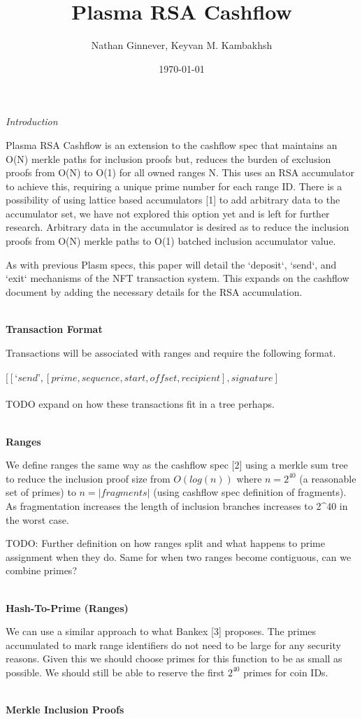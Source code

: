 \documentclass[12pt]{article}
\title{Plasma RSA Cashflow}
\author{Nathan Ginnever, Keyvan M. Kambakhsh}
\date{\today}
\begin{document}
\maketitle
\centerline{\textit{Introduction}}

Plasma RSA Cashflow is an extension to the cashflow spec that maintains an O(N) merkle paths for inclusion proofs but, reduces the burden of exclusion proofs from O(N) to O(1) for all owned ranges N. This uses an RSA accumulator to achieve this, requiring a unique prime number for each range ID. There is a possibility of using lattice based accumulators [1] to add arbitrary data to the accumulator set, we have not explored this option yet and is left for further research. Arbitrary data in the accumulator is desired as to reduce the inclusion proofs from O(N) merkle paths to O(1) batched inclusion accumulator value. 

As with previous Plasm specs, this paper will detail the `deposit`, `send`, and `exit` mechanisms of the NFT transaction system. This expands on the cashflow document by adding the necessary details for the RSA accumulation.
\\
\\
\centerline{\textbf{Transaction Format}}

Transactions will be associated with ranges and require the following format.
\\
\\
$[[‘send’, [prime, sequence, start, offset, recipient], signature]$
\\
\\
TODO expand on how these transactions fit in a tree perhaps.
\\
\\
\centerline{\textbf{Ranges}}

We define ranges the same way as the cashflow spec [2] using a merkle sum tree to reduce the inclusion proof size from $O(log(n))$ where $n = 2^{40}$ (a reasonable set of primes) to $n = |fragments|$ (using cashflow spec definition of fragments). As fragmentation increases the length of inclusion branches increases to 2^40 in the worst case. 

TODO: Further definition on how ranges split and what happens to prime assignment when they do. Same for when two ranges become contiguous, can we combine primes?
\\
\\
\centerline{\textbf{Hash-To-Prime (Ranges)}}

We can use a similar approach to what Bankex [3] proposes. The primes accumulated to mark range identifiers do not need to be large for any security reasons. Given this we should choose primes for this function to be as small as possible. We should still be able to reserve the first $2^{40}$ primes for coin IDs.
\\
\\
\centerline{\textbf{Merkle Inclusion Proofs}}
\end{document}
